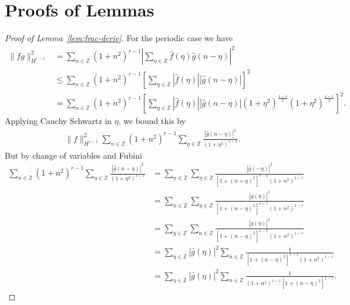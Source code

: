 \documentclass[12pt,reqno]{amsart}
\numberwithin{equation}{section}  %
\numberwithin{figure}{section}
\newcommand{\zz}{\mathbb{Z}}
\newcommand{\wh}{\widehat}
\begin{document}
\section{Proofs of Lemmas} 
\label{sec:pf-lemmas}
%
%
%
\begin{proof}[Proof of Lemma~\ref{lem:frac-deriv}]
For the periodic case we have
%
%
\begin{equation*}
\begin{split}
  \| fg\|_{H^{r-1}}^{2}
  & = \sum_{n \in \zz} (1 + n^{2})^{r-1}| \sum_{\eta \in \zz}
  \wh{f}(\eta) \wh{g}( n - \eta)  |^{2} 
  \\
  & \le \sum_{n \in \zz} (1 + n^{2})^{r-1}\left [ \sum_{\eta \in \zz}
  | \wh{f}(\eta) |  | \wh{g}(n - \eta) | 
   \right ]^{2} 
  \\
  & = \sum_{n \in \zz}  (1 + n^{2})^{r-1}\left [ \sum_{\eta \in \zz}
  | \wh{f}(\eta) |  | \wh{g}(n - \eta) | (1 +
  \eta^{2})^{\frac{1-s}{2}} (1 + \eta^{2})^{\frac{s-1}{2}}
   \right ]^{2}.
  \end{split}
\end{equation*}
%
Applying Cauchy Schwartz in $\eta$, we bound this by
%
%
%
\begin{equation}
  \label{np-key-term}
\begin{split}
  \| f \|_{H^{s-1}}^{2} \sum_{n \in \zz}  (1 + n^{2})^{r-1}\sum_{\eta \in \zz} \frac{|
  \wh{g}(n - \eta) |^{2}}{(1 + \eta^{2})^{s-1}}.
  \end{split}
\end{equation}
%
But by change of variables and Fubini
%
\begin{equation}
    \label{opp}
\begin{split}
\sum_{n \in \zz}  (1 + n^{2})^{r-1}\sum_{\eta \in \zz} \frac{|
  \wh{g}(n - \eta) |^{2}}{(1 + \eta^{2})^{s-1}}
  & = \sum_{n \in \zz} \sum_{\eta \in \zz}  
  \frac{|\wh{g}(-\eta)|^{2}}{[1 + (n + \eta)^{2}]^{s-1}(1 + n^{2})^{1-r}}  
   \\
  & =
  \sum_{n \in \zz} \sum_{\eta \in \zz}  
  \frac{|\wh{g}(\eta)|^{2}}{[1 + (n - \eta)^{2}]^{s-1}(1 + n^{2})^{1-r}}  
  \\
& = \sum_{\eta \in \zz} \sum_{n \in \zz}  
  \frac{|\wh{g}(\eta)|^{2}}{[1 + (n - \eta)^{2}]^{s-1}(1 + n^{2})^{1-r}}  
  \\
  & = \sum_{\eta \in \zz}| \wh{g}(\eta) |^{2} \sum_{n \in \zz}  
  \frac{1}{[1 + (n - \eta)^{2}]^{s-1}(1 + n^{2})^{1-r}}  
  \\
& = \sum_{\eta \in \zz}| \wh{g}(\eta) |^{2} \sum_{n \in \zz}  
  \frac{1}{(1 + n^{2})^{s-1}[1 + (n - \eta)^{2}]^{1-r}}.  

\end{split}
\end{equation}
\end{proof}
\end{document}
